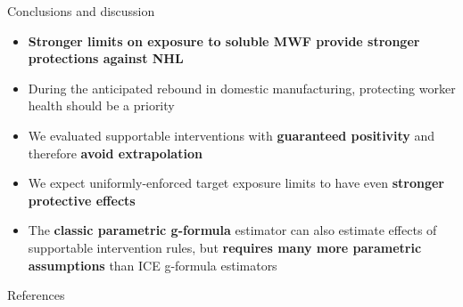 \documentclass[20pt,final]{beamer}
\newlength{\sepwid}
\newlength{\onecolwid}
\begin{document}
\begin{frame}[t]
\begin{columns}[t,totalwidth=\onecolwid]
\begin{column}{\onecolwid}
{        \begin{block}{Conclusions and discussion}
          \begin{itemize}
            \item \textbf{Stronger limits on exposure to soluble MWF provide stronger protections against NHL}
            \item During the anticipated rebound in domestic manufacturing,
                  protecting worker health should be a priority
            \item We evaluated supportable interventions with \textbf{guaranteed positivity} and therefore
                  \textbf{avoid extrapolation}
            \item We expect uniformly-enforced target exposure limits to have even
                  \textbf{stronger protective effects}
            \item The \textbf{classic parametric g-formula} estimator can also estimate
                  effects of supportable intervention rules, but
                  \textbf{requires many more parametric assumptions}
                  than ICE g-formula estimators \nocite{Taubman_2009}
          \end{itemize}
        \end{block}

        \vspace{3\baselineskip}

        \begin{block}{\normalsize References \vspace*{0.2\baselineskip}}
          \printbibliography
        \end{block}

}
\end{column}
\end{columns}
\end{frame}
\end{document}
